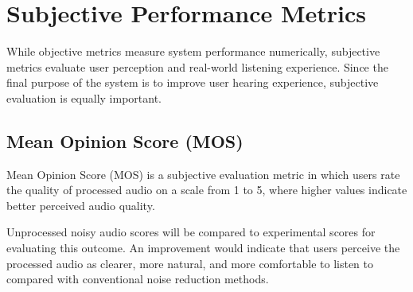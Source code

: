 \section{Subjective Performance Metrics}
While objective metrics measure system performance numerically, subjective metrics evaluate user perception and real-world listening experience. Since the final purpose of the system is to improve user hearing experience, subjective evaluation is equally important.

\subsection{Mean Opinion Score (MOS)}
Mean Opinion Score (MOS) is a subjective evaluation metric in which users rate the quality of processed audio on a scale from 1 to 5, where higher values indicate better perceived audio quality.

Unprocessed noisy audio scores will be compared to experimental scores for evaluating this outcome. An improvement would indicate that users perceive the processed audio as clearer, more natural, and more comfortable to listen to compared with conventional noise reduction methods.




